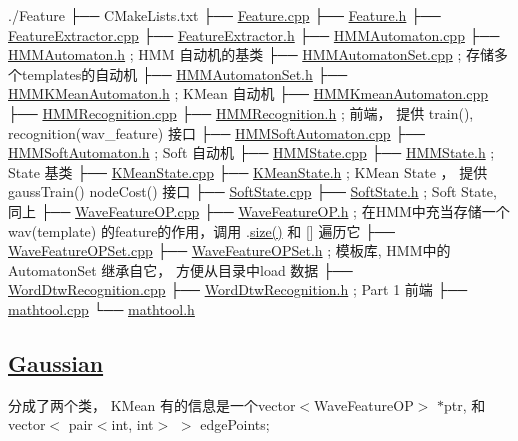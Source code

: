 ./\+Feature ├── C\+Make\+Lists.\+txt ├── \hyperlink{_feature_8cpp}{Feature.\+cpp} ├── \hyperlink{_feature_8h}{Feature.\+h} ├── \hyperlink{_feature_extractor_8cpp}{Feature\+Extractor.\+cpp} ├── \hyperlink{_feature_extractor_8h}{Feature\+Extractor.\+h} ├── \hyperlink{_h_m_m_automaton_8cpp}{H\+M\+M\+Automaton.\+cpp} ├── \hyperlink{_h_m_m_automaton_8h}{H\+M\+M\+Automaton.\+h} ; H\+M\+M 自动机的基类 ├── \hyperlink{_h_m_m_automaton_set_8cpp}{H\+M\+M\+Automaton\+Set.\+cpp} ; 存储多个templates的自动机 ├── \hyperlink{_h_m_m_automaton_set_8h}{H\+M\+M\+Automaton\+Set.\+h} ├── \hyperlink{_h_m_m_k_mean_automaton_8h}{H\+M\+M\+K\+Mean\+Automaton.\+h} ; K\+Mean 自动机 ├── \hyperlink{_h_m_m_kmean_automaton_8cpp}{H\+M\+M\+Kmean\+Automaton.\+cpp} ├── \hyperlink{_h_m_m_recognition_8cpp}{H\+M\+M\+Recognition.\+cpp} ├── \hyperlink{_h_m_m_recognition_8h}{H\+M\+M\+Recognition.\+h} ; 前端， 提供 train(), recognition(wav\+\_\+feature) 接口 ├── \hyperlink{_h_m_m_soft_automaton_8cpp}{H\+M\+M\+Soft\+Automaton.\+cpp} ├── \hyperlink{_h_m_m_soft_automaton_8h}{H\+M\+M\+Soft\+Automaton.\+h} ; Soft 自动机 ├── \hyperlink{_h_m_m_state_8cpp}{H\+M\+M\+State.\+cpp} ├── \hyperlink{_h_m_m_state_8h}{H\+M\+M\+State.\+h} ; State 基类 ├── \hyperlink{_k_mean_state_8cpp}{K\+Mean\+State.\+cpp} ├── \hyperlink{_k_mean_state_8h}{K\+Mean\+State.\+h} ; K\+Mean State ， 提供gauss\+Train() node\+Cost() 接口 ├── \hyperlink{_soft_state_8cpp}{Soft\+State.\+cpp} ├── \hyperlink{_soft_state_8h}{Soft\+State.\+h} ; Soft State, 同上 ├── \hyperlink{_wave_feature_o_p_8cpp}{Wave\+Feature\+O\+P.\+cpp} ├── \hyperlink{_wave_feature_o_p_8h}{Wave\+Feature\+O\+P.\+h} ; 在\+H\+M\+M中充当存储一个wav(template) 的feature的作用，调用 .\hyperlink{calc_dist_8h_a32b39d3c55a4c1695596bd1143f4ae24}{size()} 和 \mbox{[}\mbox{]} 遍历它 ├── \hyperlink{_wave_feature_o_p_set_8cpp}{Wave\+Feature\+O\+P\+Set.\+cpp} ├── \hyperlink{_wave_feature_o_p_set_8h}{Wave\+Feature\+O\+P\+Set.\+h} ; 模板库, H\+M\+M中的\+Automaton\+Set 继承自它， 方便从目录中load 数据 ├── \hyperlink{_word_dtw_recognition_8cpp}{Word\+Dtw\+Recognition.\+cpp} ├── \hyperlink{_word_dtw_recognition_8h}{Word\+Dtw\+Recognition.\+h} ; Part 1 前端 ├── \hyperlink{mathtool_8cpp}{mathtool.\+cpp} └── \hyperlink{mathtool_8h}{mathtool.\+h}

\subsection*{\hyperlink{class_gaussian}{Gaussian}}

分成了两个类， K\+Mean 有的信息是一个vector$<$\+Wave\+Feature\+O\+P$>$ $\ast$ptr, 和vector$<$ pair$<$int, int$>$ $>$ edge\+Points;

